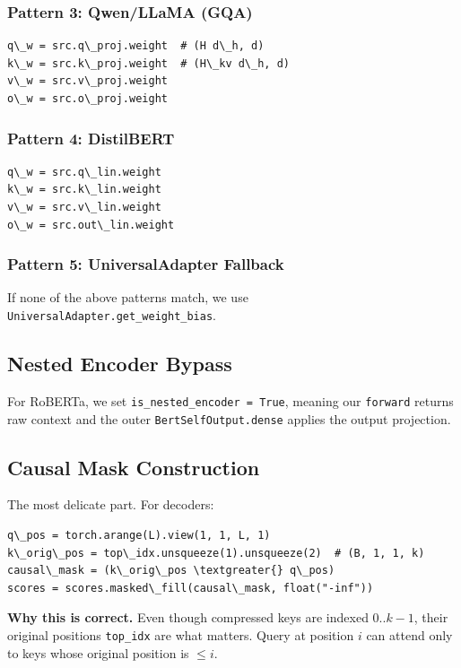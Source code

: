 \subsubsection{Pattern 3: Qwen/LLaMA (GQA)}

\begin{lstlisting}
q\_w = src.q\_proj.weight  # (H d\_h, d)
k\_w = src.k\_proj.weight  # (H\_kv d\_h, d)
v\_w = src.v\_proj.weight
o\_w = src.o\_proj.weight
\end{lstlisting}

\subsubsection{Pattern 4: DistilBERT}

\begin{lstlisting}
q\_w = src.q\_lin.weight
k\_w = src.k\_lin.weight
v\_w = src.v\_lin.weight
o\_w = src.out\_lin.weight
\end{lstlisting}

\subsubsection{Pattern 5: UniversalAdapter Fallback}

If none of the above patterns match, we use \texttt{UniversalAdapter.get\_weight\_bias}.

\subsection{Nested Encoder Bypass}

For RoBERTa, we set \texttt{is\_nested\_encoder = True}, meaning our \texttt{forward} returns 
raw context and the outer \texttt{BertSelfOutput.dense} applies the output projection.

\subsection{Causal Mask Construction}

The most delicate part. For decoders:

\begin{lstlisting}
q\_pos = torch.arange(L).view(1, 1, L, 1)
k\_orig\_pos = top\_idx.unsqueeze(1).unsqueeze(2)  # (B, 1, 1, k)
causal\_mask = (k\_orig\_pos \textgreater{} q\_pos)
scores = scores.masked\_fill(causal\_mask, float("-inf"))
\end{lstlisting}

\textbf{Why this is correct.} Even though compressed keys are indexed $0..k-1$, 
their original positions \texttt{top\_idx} are what matters. Query at position $i$ 
can attend only to keys whose original position is $\leq i$.


